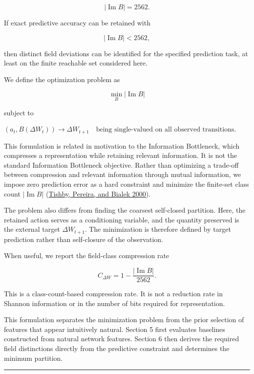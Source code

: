 \documentclass[
  11pt,
]{article}
\begin{document}
\[{|\operatorname{Im}B|=2562.}\]

If exact predictive accuracy can be retained with

\[{|\operatorname{Im}B|<2562,}\]

then distinct field deviations can be identified for the specified
prediction task, at least on the finite reachable set considered here.

We define the optimization problem as

\[{\min_B|\operatorname{Im}B|}\]

subject to

\({\left(a_t,B(\Delta W_t)\right)\longrightarrow\Delta W_{t+1} \quad\text{being single-valued on all observed transitions}.}\)

This formulation is related in motivation to the Information Bottleneck,
which compresses a representation while retaining relevant information.
It is not the standard Information Bottleneck objective. Rather than
optimizing a trade-off between compression and relevant information
through mutual information, we impose zero prediction error as a hard
constraint and minimize the finite-set class count
\({|\operatorname{Im}B|}\) (\protect\hyperlink{ref-tishby2000}{Tishby,
Pereira, and Bialek 2000}).

The problem also differs from finding the coarsest self-closed
partition. Here, the retained action serves as a conditioning variable,
and the quantity preserved is the external target \({\Delta W_{t+1}}\).
The minimization is therefore defined by target prediction rather than
self-closure of the observation.

When useful, we report the field-class compression rate

\[{C_{\Delta W}=1-\frac{|\operatorname{Im}B|}{2562}.}\]

This is a class-count-based compression rate. It is not a reduction rate
in Shannon information or in the number of bits required for
representation.

This formulation separates the minimization problem from the prior
selection of features that appear intuitively natural. Section 5 first
evaluates baselines constructed from natural network features. Section 6
then derives the required field distinctions directly from the
predictive constraint and determines the minimum partition.

\begin{center}\rule{0.5\linewidth}{0.5pt}\end{center}
\end{document}
